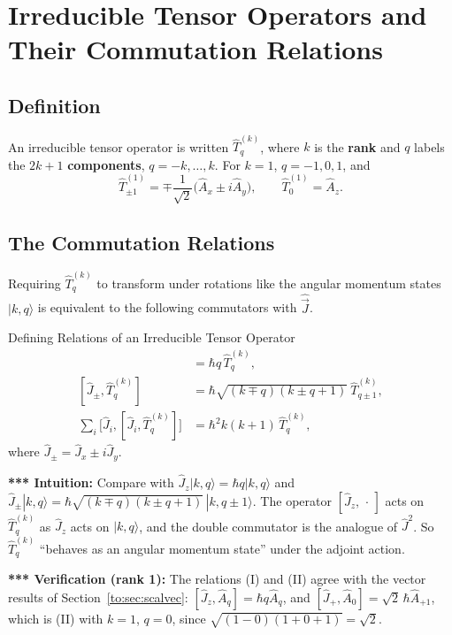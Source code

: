 \documentclass[11pt,a4paper]{article}
\begin{document}
\section{Irreducible Tensor Operators and Their Commutation Relations}
\label{to:sec:irr}

\subsection{Definition}
An irreducible tensor operator is written $\hat T^{(k)}_q$, where $k$ is the \textbf{rank} and $q$ labels the $2k+1$ \textbf{components}, $q=-k,\dots,k$. For $k=1$, $q=-1,0,1$, and
\[
\hat T^{(1)}_{\pm1}=\mp\frac1{\sqrt2}\big(\hat A_x\pm i\hat A_y\big),\qquad \hat T^{(1)}_0=\hat A_z .
\]

\subsection{The Commutation Relations}
Requiring $\hat T^{(k)}_q$ to transform under rotations like the angular momentum states $|k,q\rangle$ is equivalent to the following commutators with $\hat{\vec J}$.

\begin{thm}{Defining Relations of an Irreducible Tensor Operator}
\begin{align*}
[\hat J_z,\hat T^{(k)}_q]&=\hbar q\,\hat T^{(k)}_q,\tag{I}\\
[\hat J_\pm,\hat T^{(k)}_q]&=\hbar\sqrt{(k\mp q)(k\pm q+1)}\ \hat T^{(k)}_{q\pm1},\tag{II}\\
\sum_i\big[\hat J_i,[\hat J_i,\hat T^{(k)}_q]\big]&=\hbar^2k(k+1)\,\hat T^{(k)}_q,
\end{align*}
where $\hat J_\pm=\hat J_x\pm i\hat J_y$.
\end{thm}

\textbf{*** Intuition:} Compare with $\hat J_z|k,q\rangle=\hbar q|k,q\rangle$ and $\hat J_\pm|k,q\rangle=\hbar\sqrt{(k\mp q)(k\pm q+1)}\,|k,q\pm1\rangle$. The operator $[\hat J_z,\,\cdot\,]$ acts on $\hat T^{(k)}_q$ as $\hat J_z$ acts on $|k,q\rangle$, and the double commutator is the analogue of $\hat J^2$. So $\hat T^{(k)}_q$ ``behaves as an angular momentum state'' under the adjoint action.

\textbf{*** Verification (rank 1):} The relations (I) and (II) agree with the vector results of Section~\ref{to:sec:scalvec}: $[\hat J_z,\hat A_q]=\hbar q\hat A_q$, and $[\hat J_+,\hat A_0]=\sqrt2\,\hbar\hat A_{+1}$, which is (II) with $k=1$, $q=0$, since $\sqrt{(1-0)(1+0+1)}=\sqrt2$.
\end{document}
